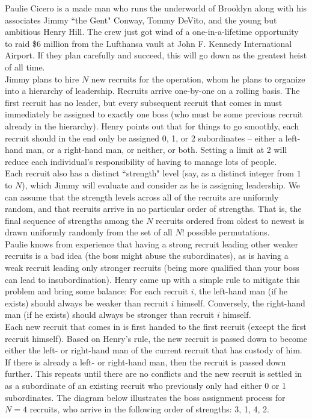 
\noindent Paulie Cicero is a made man who runs the underworld of Brooklyn along with his associates Jimmy ``the Gent" Conway, Tommy DeVito, and the young but ambitious Henry Hill. The crew just got wind of a one-in-a-lifetime opportunity to raid \$6 million from the Lufthansa vault at John F. Kennedy International Airport. If they plan carefully and succeed, this will go down as the greatest heist of all time.\\

Jimmy plans to hire $N$ new recruits for the operation, whom he plans to organize into a hierarchy of leadership. Recruits arrive one-by-one on a rolling basis. The first recruit has no leader, but every subsequent recruit that comes in must immediately be assigned to exactly one boss (who must be some previous recruit already in the hierarchy). Henry points out that for things to go smoothly, each recruit should in the end only be assigned 0, 1, or 2 subordinates -- either a left-hand man, or a right-hand man, or neither, or both. Setting a limit at 2 will reduce each individual's responsibility of having to manage lots of people.\\

Each recruit also has a distinct ``strength" level (say, as a distinct integer from $1$ to $N$), which Jimmy will evaluate and consider as he is assigning leadership. We can assume that the strength levels across all of the recruits are uniformly random, and that recruits arrive in no particular order of strengths. That is, the final sequence of strengths among the $N$ recruits ordered from oldest to newest is drawn uniformly randomly from the set of all $N!$ possible permutations.\\

Paulie knows from experience that having a strong recruit leading other weaker recruits is a bad idea (the boss might abuse the subordinates), as is having a weak recruit leading only stronger recruits (being more qualified than your boss can lead to insubordination). Henry came up with a simple rule to mitigate this problem and bring some balance: For each recruit $i$, the left-hand man (if he exists) should always be weaker than recruit $i$ himself. Conversely, the right-hand man (if he exists) should always be stronger than recruit $i$ himself.\\

Each new recruit that comes in is first handed to the first recruit (except the first recruit himself). Based on Henry's rule, the new recruit is passed down to become either the left- or right-hand man of the current recruit that has custody of him. If there is already a left- or right-hand man, then the recruit is passed down further. This repeats until there are no conflicts and the new recruit is settled in as a subordinate of an existing recruit who previously only had either 0 or 1 subordinates. The diagram below illustrates the boss assignment process for $N = 4$ recruits, who arrive in the following order of strengths: 3, 1, 4, 2.\\


